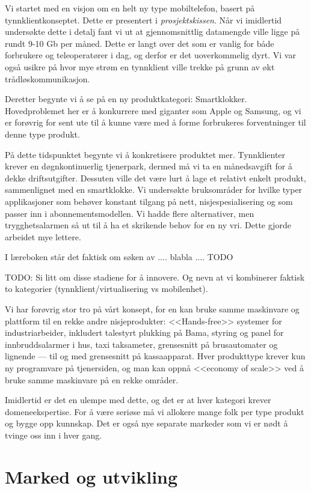 Vi startet med en visjon om en helt ny type mobiltelefon, basert på
tynnklientkonseptet. Dette er presentert i \textit{prosjektskissen}. Når vi
imidlertid undersøkte dette i detalj fant vi ut at gjennomsnittlig datamengde
ville ligge på rundt 9-10 Gb per måned. Dette er langt over det som er vanlig
for både forbrukere og teleoperatører i dag, og derfor er det uoverkommelig
dyrt. Vi var også usikre på hvor mye strøm en tynnklient ville trekke på grunn
av økt trådløskommunikasjon.

Deretter begynte vi å se på en ny produktkategori: Smartklokker. Hovedproblemet
her er å konkurrere med giganter som Apple og Samsung, og vi er forøvrig for
sent ute til å kunne være med å forme forbrukeres forventninger til denne type
produkt.

På dette tidspunktet begynte vi å konkretisere produktet mer. Tynnklienter
krever en døgnkontinuerlig tjenerpark, dermed må vi ta en månedsavgift for å
dekke driftsutgifter. Dessuten ville det være lurt å lage et relativt enkelt
produkt, sammenlignet med en smartklokke. Vi undersøkte bruksområder for hvilke
typer applikasjoner som behøver konstant tilgang på nett, nisjespesialisering og som passer inn i
abonnementsmodellen. Vi hadde flere alternativer, men trygghetsalarmen så ut
til å ha et skrikende behov for en ny vri. Dette gjorde arbeidet mye lettere.

I læreboken står det faktisk om søken av .... blabla .... TODO

TODO: Si litt om disse stadiene for å innovere. Og nevn at vi kombinerer
faktisk to kategorier (tynnklient/virtualisering vs mobilenhet).

Vi har forøvrig stor tro på vårt konsept, for en kan bruke samme maskinvare og
plattform til en rekke andre nisjeprodukter: <<Hands-free>> systemer for
industriarbeider, inkludert talestyrt plukking på Bama, styring og panel for
innbruddsalarmer i hus, taxi taksameter, grensesnitt på brusautomater og
lignende --- til og med grensesnitt på kassaapparat.  Hver produkttype krever
kun ny programvare på tjenersiden, og man kan oppnå <<economy of scale>> ved å
bruke samme maskinvare på en rekke områder.

Imidlertid er det en ulempe med dette, og det er at hver kategori krever
domeneekspertise. For å være seriøse må vi allokere mange folk per type produkt
og bygge opp kunnskap. Det er også nye separate markeder som vi er nødt å
tvinge oss inn i hver gang.


\section{Marked og utvikling}

